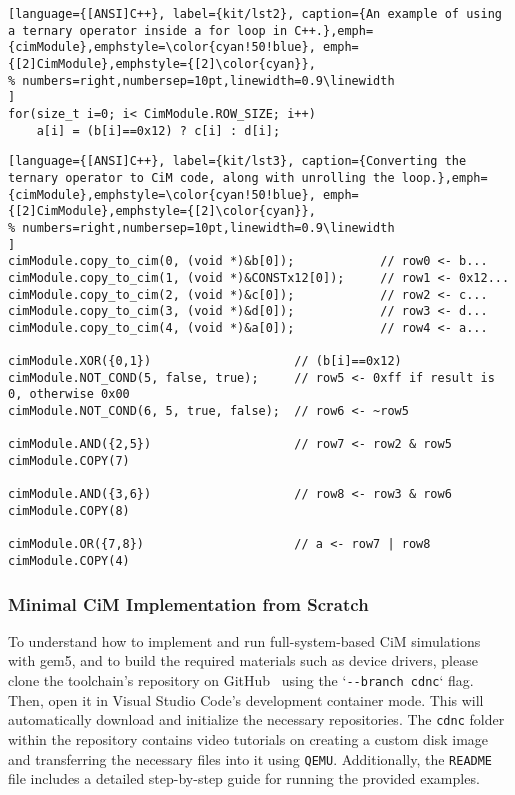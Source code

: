 \begin{lstlisting}[language={[ANSI]C++}, label={kit/lst2}, caption={An example of using a ternary operator inside a for loop in C++.},emph={cimModule},emphstyle=\color{cyan!50!blue}, emph={[2]CimModule},emphstyle={[2]\color{cyan}},
% numbers=right,numbersep=10pt,linewidth=0.9\linewidth
]
for(size_t i=0; i< CimModule.ROW_SIZE; i++)
    a[i] = (b[i]==0x12) ? c[i] : d[i];
\end{lstlisting}
\begin{lstlisting}[language={[ANSI]C++}, label={kit/lst3}, caption={Converting the ternary operator to CiM code, along with unrolling the loop.},emph={cimModule},emphstyle=\color{cyan!50!blue}, emph={[2]CimModule},emphstyle={[2]\color{cyan}},
% numbers=right,numbersep=10pt,linewidth=0.9\linewidth
]
cimModule.copy_to_cim(0, (void *)&b[0]);            // row0 <- b...
cimModule.copy_to_cim(1, (void *)&CONSTx12[0]);     // row1 <- 0x12...
cimModule.copy_to_cim(2, (void *)&c[0]);            // row2 <- c...
cimModule.copy_to_cim(3, (void *)&d[0]);            // row3 <- d...
cimModule.copy_to_cim(4, (void *)&a[0]);            // row4 <- a...

cimModule.XOR({0,1})                    // (b[i]==0x12)
cimModule.NOT_COND(5, false, true);     // row5 <- 0xff if result is 0, otherwise 0x00
cimModule.NOT_COND(6, 5, true, false);  // row6 <- ~row5

cimModule.AND({2,5})                    // row7 <- row2 & row5
cimModule.COPY(7)

cimModule.AND({3,6})                    // row8 <- row3 & row6
cimModule.COPY(8)

cimModule.OR({7,8})                     // a <- row7 | row8
cimModule.COPY(4)
\end{lstlisting}
\subsubsection*{Minimal CiM Implementation from Scratch}
To understand how to implement and run full-system-based CiM simulations with gem5, and to build the required materials such as device drivers, please clone the toolchain's repository on GitHub~\cite{repo} using the `\texttt{-{}-branch cdnc}` flag. Then, open it in Visual Studio Code's development container mode. This will automatically download and initialize the necessary repositories.
The \texttt{cdnc} folder within the repository contains video tutorials on creating a custom disk image and transferring the necessary files into it using \texttt{QEMU}. Additionally, the \texttt{README} file includes a detailed step-by-step guide for running the provided examples.

